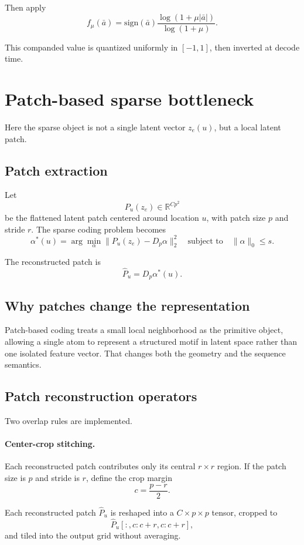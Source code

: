 \documentclass[11pt]{article}
\newcommand{\R}{\mathbb{R}}
\begin{document}
Then apply
\[
f_\mu(\bar a)
=
\mathrm{sign}(\bar a)
\frac{\log(1 + \mu |\bar a|)}{\log(1+\mu)}.
\]

This companded value is quantized uniformly in $[-1,1]$, then inverted at decode time.

\section{Patch-based sparse bottleneck}

Here the sparse object is not a single latent vector $z_e(u)$, but a local latent patch.

\subsection{Patch extraction}

Let
\[
P_u(z_e) \in \R^{C p^2}
\]
be the flattened latent patch centered around location $u$, with patch size $p$ and stride $r$. The sparse coding problem becomes
\[
\alpha^*(u)
=
\arg\min_{\alpha}
\|P_u(z_e) - D_p \alpha\|_2^2
\quad
\text{subject to}
\quad
\|\alpha\|_0 \le s.
\]

The reconstructed patch is
\[
\hat P_u = D_p \alpha^*(u).
\]

\subsection{Why patches change the representation}

Patch-based coding treats a small local neighborhood as the primitive object, allowing a single atom to represent a structured motif in latent space rather than one isolated feature vector. That changes both the geometry and the sequence semantics.

\subsection{Patch reconstruction operators}

Two overlap rules are implemented.

\paragraph{Center-crop stitching.}
Each reconstructed patch contributes only its central $r \times r$ region. If the patch size is $p$ and stride is $r$, define the crop margin
\[
c = \frac{p-r}{2}.
\]

Each reconstructed patch $\hat P_u$ is reshaped into a $C \times p \times p$ tensor, cropped to
\[
\hat P_u[:, c:c+r, c:c+r],
\]
and tiled into the output grid without averaging.
\end{document}
